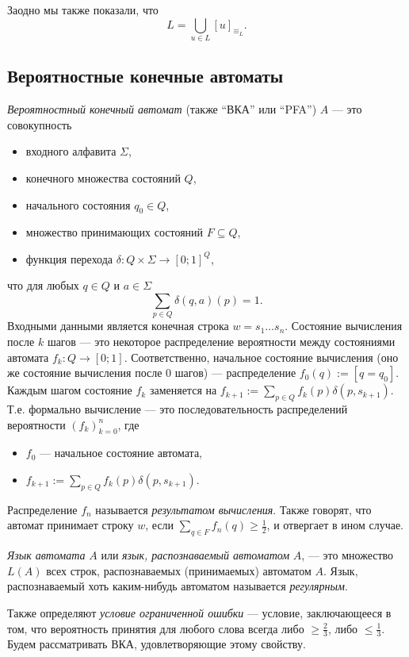 \documentclass[12pt,a4paper]{article}
\begin{document}
    \begin{remark*}
        Заодно мы также показали, что
        \[L = \bigcup_{u \in L} [u]_{\equiv_L}.\]
    \end{remark*}

    \subsection{Вероятностные конечные автоматы}

    \begin{definition}
        \emph{Вероятностный конечный автомат} (также ``ВКА'' или ``PFA'') $A$ --- это совокупность
        \begin{itemize}
            \item входного алфавита $\Sigma$,
            \item конечного множества состояний $Q$,
            \item начального состояния $q_0 \in Q$,
            \item множество принимающих состояний $F \subseteq Q$,
            \item функция перехода $\delta: Q \times \Sigma \to [0; 1]^Q$,
        \end{itemize}
        что для любых $q \in Q$ и $a \in \Sigma$ 
        \[\sum_{p \in Q} \delta(q, a)(p) = 1.\]
        Входными данными является конечная строка $w = s_1 \dots s_n$. Состояние вычисления после $k$ шагов --- это некоторое распределение вероятности между состояниями автомата $f_k: Q \to [0; 1]$. Соответственно, начальное состояние вычисления (оно же состояние вычисления после $0$ шагов) --- распределение $f_0(q) := [q = q_0]$. Каждым шагом состояние $f_k$ заменяется на $f_{k+1} := \sum_{p \in Q} f_k(p) \delta(p, s_{k+1})$. Т.е. формально вычисление --- это последовательность распределений вероятности $(f_k)_{k=0}^n$, где
        \begin{itemize}
            \item $f_0$ --- начальное состояние автомата,
            \item $f_{k+1} := \sum_{p \in Q} f_k(p) \delta(p, s_{k+1})$.
        \end{itemize}
        Распределение $f_n$ называется \emph{результатом вычисления}. Также говорят, что автомат принимает строку $w$, если $\sum_{q \in F} f_n(q) \geqslant \frac{1}{2}$, и отвергает в ином случае.

        \emph{Язык автомата} $A$ или \emph{язык, распознаваемый автоматом} $A$, --- это множество $L(A)$ всех строк, распознаваемых (принимаемых) автоматом $A$. Язык, распознаваемый хоть каким-нибудь автоматом называется \emph{регулярным}.
        
        Также определяют \emph{условие ограниченной ошибки} --- условие, заключающееся в том, что вероятность принятия для любого слова всегда либо $\geqslant \frac{2}{3}$, либо $\leqslant \frac{1}{3}$. Будем рассматривать ВКА, удовлетворяющие этому свойству.
    \end{definition}
\end{document}
